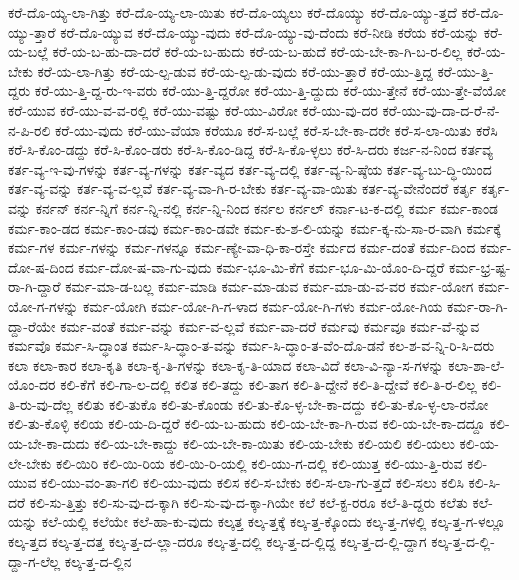 {ಕರೆ-ದೊ-ಯ್ಯ-ಲಾ-ಗಿತ್ತು
ಕರೆ-ದೊ-ಯ್ಯ-ಲಾ-ಯಿತು
ಕರೆ-ದೊ-ಯ್ಯಲು
ಕರೆ-ದೊಯ್ಯು
ಕರೆ-ದೊ-ಯ್ಯು-ತ್ತದೆ
ಕರೆ-ದೊ-ಯ್ಯು-ತ್ತಾರೆ
ಕರೆ-ದೊ-ಯ್ಯುವ
ಕರೆ-ದೊ-ಯ್ಯು-ವುದು
ಕರೆ-ದೊ-ಯ್ಯು-ವು-ದೆಂದು
ಕರೆ-ನೀಡಿ
ಕರೆಯ
ಕರೆ-ಯನ್ನು
ಕರೆ-ಯ-ಬಲ್ಲೆ
ಕರೆ-ಯ-ಬ-ಹು-ದಾ-ದರೆ
ಕರೆ-ಯ-ಬ-ಹುದು
ಕರೆ-ಯ-ಬ-ಹುದೆ
ಕರೆ-ಯ-ಬೇ-ಕಾ-ಗಿ-ಬ-ರ-ಲಿಲ್ಲ
ಕರೆ-ಯ-ಬೇಕು
ಕರೆ-ಯ-ಲಾ-ಗಿತ್ತು
ಕರೆ-ಯ-ಲ್ಪ-ಡುವ
ಕರೆ-ಯ-ಲ್ಪ-ಡು-ವುದು
ಕರೆ-ಯು-ತ್ತಾರೆ
ಕರೆ-ಯು-ತ್ತಿದ್ದ
ಕರೆ-ಯು-ತ್ತಿ-ದ್ದರು
ಕರೆ-ಯು-ತ್ತಿ-ದ್ದ-ರು-ಇ-ವರು
ಕರೆ-ಯು-ತ್ತಿ-ದ್ದರೋ
ಕರೆ-ಯು-ತ್ತಿ-ದ್ದುದು
ಕರೆ-ಯು-ತ್ತೇನೆ
ಕರೆ-ಯು-ತ್ತೇ-ವೆಯೋ
ಕರೆ-ಯುವ
ಕರೆ-ಯು-ವ-ವ-ರಲ್ಲಿ
ಕರೆ-ಯು-ವಷ್ಟು
ಕರೆ-ಯು-ವಿರೋ
ಕರೆ-ಯು-ವು-ದರ
ಕರೆ-ಯು-ವು-ದಾ-ದ-ರೆ-ನೆ-ನ-ಪಿ-ರಲಿ
ಕರೆ-ಯು-ವುದು
ಕರೆ-ಯು-ವೆಯಾ
ಕರೆಯೂ
ಕರೆ-ಸ-ಬಲ್ಲೆ
ಕರೆ-ಸ-ಬೇ-ಕಾ-ದರೇ
ಕರೆ-ಸ-ಲಾ-ಯಿತು
ಕರೆಸಿ
ಕರೆ-ಸಿ-ಕೊಂ-ಡದ್ದು
ಕರೆ-ಸಿ-ಕೊಂ-ಡರು
ಕರೆ-ಸಿ-ಕೊಂ-ಡಿದ್ದ
ಕರೆ-ಸಿ-ಕೊ-ಳ್ಳಲು
ಕರೆ-ಸಿ-ದರು
ಕರ್ಜ-ನ-ನಿಂದ
ಕರ್ತವ್ಯ
ಕರ್ತ-ವ್ಯ-ಇ-ವು-ಗಳನ್ನು
ಕರ್ತ-ವ್ಯ-ಗಳನ್ನು
ಕರ್ತ-ವ್ಯದ
ಕರ್ತ-ವ್ಯ-ದಲ್ಲಿ
ಕರ್ತ-ವ್ಯ-ನಿ-ಷ್ಠೆಯ
ಕರ್ತ-ವ್ಯ-ಬು-ದ್ಧಿ-ಯಿಂದ
ಕರ್ತ-ವ್ಯ-ವನ್ನು
ಕರ್ತ-ವ್ಯ-ವ-ಲ್ಲವೆ
ಕರ್ತ-ವ್ಯ-ವಾ-ಗಿ-ರ-ಬೇಕು
ಕರ್ತ-ವ್ಯ-ವಾ-ಯಿತು
ಕರ್ತ-ವ್ಯ-ವೇನೆಂದರೆ
ಕರ್ತೃ
ಕರ್ತೃ-ವನ್ನು
ಕರ್ನನ್
ಕರ್ನ-ನ್ನಿಗೆ
ಕರ್ನ-ನ್ನಿ-ನಲ್ಲಿ
ಕರ್ನ-ನ್ನಿ-ನಿಂದ
ಕರ್ನಲ
ಕರ್ನಲ್
ಕರ್ನಾ-ಟ-ಕ-ದಲ್ಲಿ
ಕರ್ಮ
ಕರ್ಮ-ಕಾಂಡ
ಕರ್ಮ-ಕಾಂ-ಡದ
ಕರ್ಮ-ಕಾಂ-ಡವು
ಕರ್ಮ-ಕಾಂ-ಡವೇ
ಕರ್ಮ-ಕು-ಶ-ಲಿ-ಯನ್ನು
ಕರ್ಮ-ಕ್ಕ-ನು-ಸಾ-ರ-ವಾಗಿ
ಕರ್ಮಕ್ಕೆ
ಕರ್ಮ-ಗಳ
ಕರ್ಮ-ಗಳನ್ನು
ಕರ್ಮ-ಗಳನ್ನೂ
ಕರ್ಮ-ಣ್ಯೇ-ವಾ-ಧಿ-ಕಾ-ರಸ್ತೇ
ಕರ್ಮದ
ಕರ್ಮ-ದಂತೆ
ಕರ್ಮ-ದಿಂದ
ಕರ್ಮ-ದೋ-ಷ-ದಿಂದ
ಕರ್ಮ-ದೋ-ಷ-ವಾ-ಗು-ವುದು
ಕರ್ಮ-ಭೂ-ಮಿ-ಕೆಗೆ
ಕರ್ಮ-ಭೂ-ಮಿ-ಯೊಂ-ದಿ-ದ್ದರೆ
ಕರ್ಮ-ಭ್ರ-ಷ್ಟ-ರಾ-ಗಿ-ದ್ದಾರೆ
ಕರ್ಮ-ಮಾ-ಡ-ಬಲ್ಲ
ಕರ್ಮ-ಮಾಡಿ
ಕರ್ಮ-ಮಾ-ಡುವ
ಕರ್ಮ-ಮಾ-ಡು-ವ-ವರ
ಕರ್ಮ-ಯೋಗ
ಕರ್ಮ-ಯೋ-ಗ-ಗಳನ್ನು
ಕರ್ಮ-ಯೋಗಿ
ಕರ್ಮ-ಯೋ-ಗಿ-ಗ-ಳಾದ
ಕರ್ಮ-ಯೋ-ಗಿ-ಗಳು
ಕರ್ಮ-ಯೋ-ಗಿಯ
ಕರ್ಮ-ರಾ-ಗಿ-ದ್ದಾ-ರೆಯೇ
ಕರ್ಮ-ವಂತೆ
ಕರ್ಮ-ವನ್ನು
ಕರ್ಮ-ವ-ಲ್ಲವೆ
ಕರ್ಮ-ವಾ-ದರೆ
ಕರ್ಮವು
ಕರ್ಮವೂ
ಕರ್ಮ-ವೆ-ನ್ನುವ
ಕರ್ಮವೊ
ಕರ್ಮ-ಸಿ-ದ್ಧಾಂತ
ಕರ್ಮ-ಸಿ-ದ್ಧಾಂ-ತ-ವನ್ನು
ಕರ್ಮ-ಸಿ-ದ್ಧಾಂ-ತ-ವೆಂ-ದೊ-ಡನೆ
ಕಲ-ಶ-ವ-ನ್ನಿ-ರಿ-ಸಿ-ದರು
ಕಲಾ
ಕಲಾ-ಕಾರ
ಕಲಾ-ಕೃತಿ
ಕಲಾ-ಕೃ-ತಿ-ಗಳನ್ನು
ಕಲಾ-ಕೃ-ತಿ-ಯಾದ
ಕಲಾ-ವಿದೆ
ಕಲಾ-ವಿ-ನ್ಯಾ-ಸ-ಗಳನ್ನು
ಕಲಾ-ಶಾ-ಲೆ-ಯೊಂ-ದರ
ಕಲಿ-ಕೆಗೆ
ಕಲಿ-ಗಾ-ಲ-ದಲ್ಲಿ
ಕಲಿತ
ಕಲಿ-ತದ್ದು
ಕಲಿ-ತಾಗ
ಕಲಿ-ತಿ-ದ್ದೇನೆ
ಕಲಿ-ತಿ-ದ್ದೇವೆ
ಕಲಿ-ತಿ-ರ-ಲಿಲ್ಲ
ಕಲಿ-ತಿ-ರು-ವು-ದೆಲ್ಲ
ಕಲಿತು
ಕಲಿ-ತುಕೊ
ಕಲಿ-ತು-ಕೊಂಡು
ಕಲಿ-ತು-ಕೊ-ಳ್ಳ-ಬೇ-ಕಾ-ದದ್ದು
ಕಲಿ-ತು-ಕೊ-ಳ್ಳ-ಲಾ-ರನೋ
ಕಲಿ-ತು-ಕೊಳ್ಳಿ
ಕಲಿಯ
ಕಲಿ-ಯ-ದಿ-ದ್ದರೆ
ಕಲಿ-ಯ-ಬ-ಹುದು
ಕಲಿ-ಯ-ಬೇ-ಕಾ-ಗಿ-ರುವ
ಕಲಿ-ಯ-ಬೇ-ಕಾ-ದದ್ದೂ
ಕಲಿ-ಯ-ಬೇ-ಕಾ-ದುದು
ಕಲಿ-ಯ-ಬೇ-ಕಾದ್ದು
ಕಲಿ-ಯ-ಬೇ-ಕಾ-ಯಿತು
ಕಲಿ-ಯ-ಬೇಕು
ಕಲಿ-ಯಲಿ
ಕಲಿ-ಯಲು
ಕಲಿ-ಯ-ಲೇ-ಬೇಕು
ಕಲಿ-ಯಿರಿ
ಕಲಿ-ಯಿ-ರಿಯ
ಕಲಿ-ಯಿ-ರಿ-ಯಲ್ಲಿ
ಕಲಿ-ಯು-ಗ-ದಲ್ಲಿ
ಕಲಿ-ಯುತ್ತ
ಕಲಿ-ಯು-ತ್ತಿ-ರುವ
ಕಲಿ-ಯುವ
ಕಲಿ-ಯು-ವಂ-ತಾ-ಗಲಿ
ಕಲಿ-ಯು-ವುದು
ಕಲಿಸ
ಕಲಿ-ಸ-ಬೇಕು
ಕಲಿ-ಸ-ಲಾ-ಗು-ತ್ತದೆ
ಕಲಿ-ಸಲು
ಕಲಿಸಿ
ಕಲಿ-ಸಿ-ದರೆ
ಕಲಿ-ಸು-ತ್ತಿತ್ತು
ಕಲಿ-ಸು-ವು-ದ-ಕ್ಕಾಗಿ
ಕಲಿ-ಸು-ವು-ದ-ಕ್ಕಾ-ಗಿಯೇ
ಕಲೆ
ಕಲೆ-ಕ್ಟ-ರರೂ
ಕಲೆ-ತಿ-ದ್ದರು
ಕಲೆತು
ಕಲೆ-ಯನ್ನು
ಕಲೆ-ಯಲ್ಲಿ
ಕಲೆಯೇ
ಕಲೆ-ಹಾ-ಕು-ವುದು
ಕಲ್ಕತ್ತ
ಕಲ್ಕ-ತ್ತಕ್ಕೆ
ಕಲ್ಕ-ತ್ತ-ಕ್ಕೊಂದು
ಕಲ್ಕ-ತ್ತ-ಗಳಲ್ಲಿ
ಕಲ್ಕ-ತ್ತ-ಗ-ಳಲ್ಲೂ
ಕಲ್ಕ-ತ್ತದ
ಕಲ್ಕ-ತ್ತ-ದತ್ತ
ಕಲ್ಕ-ತ್ತ-ದ-ಲ್ಲಾ-ದರೂ
ಕಲ್ಕ-ತ್ತ-ದಲ್ಲಿ
ಕಲ್ಕ-ತ್ತ-ದ-ಲ್ಲಿದ್ದ
ಕಲ್ಕ-ತ್ತ-ದ-ಲ್ಲಿ-ದ್ದಾಗ
ಕಲ್ಕ-ತ್ತ-ದ-ಲ್ಲಿ-ದ್ದಾ-ಗ-ಲೆಲ್ಲ
ಕಲ್ಕ-ತ್ತ-ದ-ಲ್ಲಿನ
}
